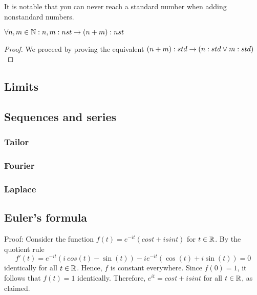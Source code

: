 It is notable that you can never reach a standard number when adding nonstandard numbers.
\begin{theorem}
    $ \forall n,m \in \mathbb{N}: n,m:nst \to (n+m):nst $
\end{theorem}
\begin{proof}
    We proceed by proving the equivalent $ (n+m):std \to (n:std \lor m:std) $ 
\end{proof}


\subsection{Limits}

\subsection{Sequences and series}

\subsubsection{Tailor}
\subsubsection{Fourier}
\subsubsection{Laplace}

\subsection{Euler's formula}
Proof: Consider the function $f(t)=e^{-it}(cost+isint)$ for $t \in \mathbb{R}$. By the quotient rule
$$ f'(t) = e^{-it} (i\ cos(t) - \sin(t)) -ie^{-it} (\cos(t) + i \sin(t)) = 0 $$
identically for all $t \in \mathbb{R}$. Hence, $f$ is constant everywhere. Since $f(0)=1$, it follows that $f(t)=1$ identically. Therefore, $e^{it}=cost+isint$ for all $t \in \mathbb{R}$, as claimed.


